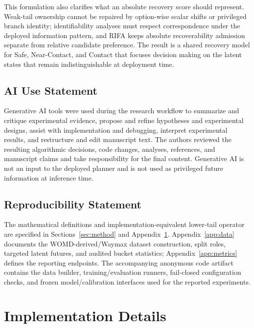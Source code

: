 \documentclass{article} %
\begin{document}
This formulation also clarifies what an absolute recovery score should represent. Weak-tail ownership cannot be repaired by option-wise scalar shifts or privileged branch identity; identifiability analyses must respect correspondence under the deployed information pattern, and RIFA keeps absolute recoverability admission separate from relative candidate preference. The result is a shared recovery model for Safe, Near-Contact, and Contact that focuses decision making on the latent states that remain indistinguishable at deployment time.

\subsection*{AI Use Statement}
Generative AI tools were used during the research workflow to summarize and critique experimental evidence, propose and refine hypotheses and experimental designs, assist with implementation and debugging, interpret experimental results, and restructure and edit manuscript text. The authors reviewed the resulting algorithmic decisions, code changes, analyses, references, and manuscript claims and take responsibility for the final content. Generative AI is not an input to the deployed planner and is not used as privileged future information at inference time.

\subsection*{Reproducibility Statement}
The mathematical definitions and implementation-equivalent lower-tail operator are specified in Sections~\ref{sec:method} and Appendix~\ref{app:implementation}. Appendix~\ref{app:data} documents the WOMD-derived/Waymax dataset construction, split roles, targeted latent futures, and audited bucket statistics; Appendix~\ref{app:metrics} defines the reporting endpoints. The accompanying anonymous code artifact contains the data builder, training/evaluation runners, fail-closed configuration checks, and frozen model/calibration interfaces used for the reported experiments.




\appendix

\section{Implementation Details}
\label{app:implementation}
\end{document}
